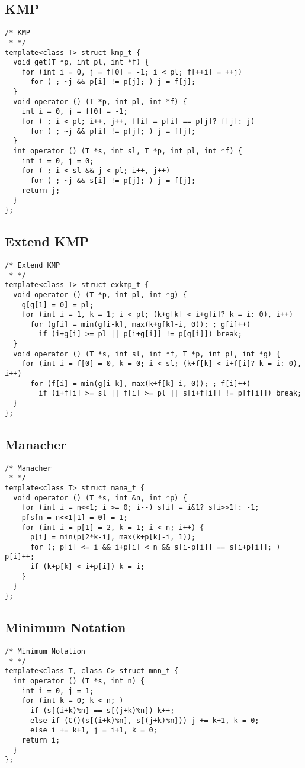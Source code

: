 \subsection{KMP}
\begin{lstlisting}
/* KMP
 * */
template<class T> struct kmp_t {
  void get(T *p, int pl, int *f) {
    for (int i = 0, j = f[0] = -1; i < pl; f[++i] = ++j)
      for ( ; ~j && p[i] != p[j]; ) j = f[j];
  }
  void operator () (T *p, int pl, int *f) {
    int i = 0, j = f[0] = -1;
    for ( ; i < pl; i++, j++, f[i] = p[i] == p[j]? f[j]: j)
      for ( ; ~j && p[i] != p[j]; ) j = f[j];
  }
  int operator () (T *s, int sl, T *p, int pl, int *f) {
    int i = 0, j = 0;
    for ( ; i < sl && j < pl; i++, j++)
      for ( ; ~j && s[i] != p[j]; ) j = f[j];
    return j;
  }
};
\end{lstlisting}


\subsection{Extend KMP}
\begin{lstlisting}
/* Extend_KMP
 * */
template<class T> struct exkmp_t {
  void operator () (T *p, int pl, int *g) {
    g[g[1] = 0] = pl;
    for (int i = 1, k = 1; i < pl; (k+g[k] < i+g[i]? k = i: 0), i++)
      for (g[i] = min(g[i-k], max(k+g[k]-i, 0)); ; g[i]++)
        if (i+g[i] >= pl || p[i+g[i]] != p[g[i]]) break;
  }
  void operator () (T *s, int sl, int *f, T *p, int pl, int *g) {
    for (int i = f[0] = 0, k = 0; i < sl; (k+f[k] < i+f[i]? k = i: 0), i++)
      for (f[i] = min(g[i-k], max(k+f[k]-i, 0)); ; f[i]++)
        if (i+f[i] >= sl || f[i] >= pl || s[i+f[i]] != p[f[i]]) break;
  }
};
\end{lstlisting}


\subsection{Manacher}
\begin{lstlisting}
/* Manacher
 * */
template<class T> struct mana_t {
  void operator () (T *s, int &n, int *p) {
    for (int i = n<<1; i >= 0; i--) s[i] = i&1? s[i>>1]: -1;
    p[s[n = n<<1|1] = 0] = 1;
    for (int i = p[1] = 2, k = 1; i < n; i++) {
      p[i] = min(p[2*k-i], max(k+p[k]-i, 1));
      for (; p[i] <= i && i+p[i] < n && s[i-p[i]] == s[i+p[i]]; ) p[i]++;
      if (k+p[k] < i+p[i]) k = i;
    }
  }
};
\end{lstlisting}


\subsection{Minimum Notation}
\begin{lstlisting}
/* Minimum_Notation
 * */
template<class T, class C> struct mnn_t {
  int operator () (T *s, int n) {
    int i = 0, j = 1;
    for (int k = 0; k < n; )
      if (s[(i+k)%n] == s[(j+k)%n]) k++;
      else if (C()(s[(i+k)%n], s[(j+k)%n])) j += k+1, k = 0;
      else i += k+1, j = i+1, k = 0;
    return i;
  }
};
\end{lstlisting}



